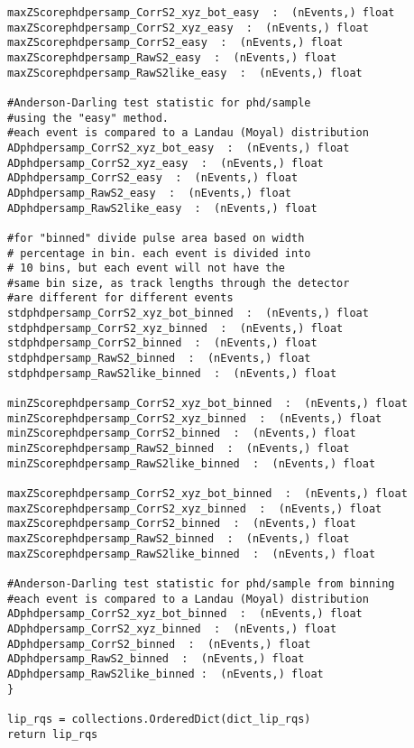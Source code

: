 \begin{Verbatim}[fontsize=\footnotesize]
maxZScorephdpersamp_CorrS2_xyz_bot_easy  :  (nEvents,) float
maxZScorephdpersamp_CorrS2_xyz_easy  :  (nEvents,) float
maxZScorephdpersamp_CorrS2_easy  :  (nEvents,) float
maxZScorephdpersamp_RawS2_easy  :  (nEvents,) float
maxZScorephdpersamp_RawS2like_easy  :  (nEvents,) float

#Anderson-Darling test statistic for phd/sample
#using the "easy" method.
#each event is compared to a Landau (Moyal) distribution
ADphdpersamp_CorrS2_xyz_bot_easy  :  (nEvents,) float
ADphdpersamp_CorrS2_xyz_easy  :  (nEvents,) float
ADphdpersamp_CorrS2_easy  :  (nEvents,) float
ADphdpersamp_RawS2_easy  :  (nEvents,) float
ADphdpersamp_RawS2like_easy  :  (nEvents,) float

#for "binned" divide pulse area based on width
# percentage in bin. each event is divided into
# 10 bins, but each event will not have the 
#same bin size, as track lengths through the detector 
#are different for different events
stdphdpersamp_CorrS2_xyz_bot_binned  :  (nEvents,) float
stdphdpersamp_CorrS2_xyz_binned  :  (nEvents,) float
stdphdpersamp_CorrS2_binned  :  (nEvents,) float
stdphdpersamp_RawS2_binned  :  (nEvents,) float
stdphdpersamp_RawS2like_binned  :  (nEvents,) float

minZScorephdpersamp_CorrS2_xyz_bot_binned  :  (nEvents,) float
minZScorephdpersamp_CorrS2_xyz_binned  :  (nEvents,) float
minZScorephdpersamp_CorrS2_binned  :  (nEvents,) float
minZScorephdpersamp_RawS2_binned  :  (nEvents,) float
minZScorephdpersamp_RawS2like_binned  :  (nEvents,) float

maxZScorephdpersamp_CorrS2_xyz_bot_binned  :  (nEvents,) float
maxZScorephdpersamp_CorrS2_xyz_binned  :  (nEvents,) float
maxZScorephdpersamp_CorrS2_binned  :  (nEvents,) float
maxZScorephdpersamp_RawS2_binned  :  (nEvents,) float
maxZScorephdpersamp_RawS2like_binned  :  (nEvents,) float

#Anderson-Darling test statistic for phd/sample from binning
#each event is compared to a Landau (Moyal) distribution
ADphdpersamp_CorrS2_xyz_bot_binned  :  (nEvents,) float
ADphdpersamp_CorrS2_xyz_binned  :  (nEvents,) float
ADphdpersamp_CorrS2_binned  :  (nEvents,) float
ADphdpersamp_RawS2_binned  :  (nEvents,) float
ADphdpersamp_RawS2like_binned :  (nEvents,) float
}

lip_rqs = collections.OrderedDict(dict_lip_rqs)
return lip_rqs
\end{Verbatim}
